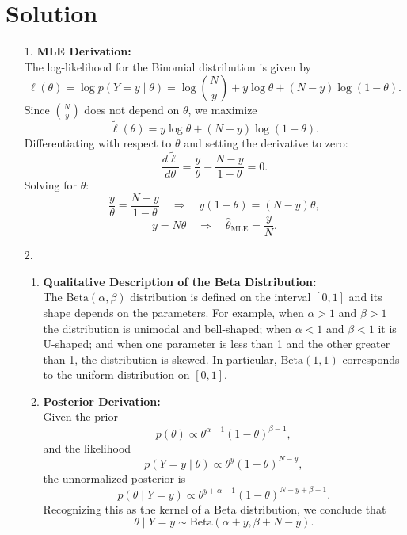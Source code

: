 \documentclass[submit]{../harvardml}
\newenvironment{answer}
  {\section*{Solution}}
{}
\begin{document}
\begin{answer}
  \begin{enumerate}
    \item[1.]
      \textbf{MLE Derivation:}\\
      The log-likelihood for the Binomial distribution is given by
      \[
      \ell(\theta) = \log p(Y=y \mid \theta) = \log \binom{N}{y} + y\log\theta + (N-y)\log(1-\theta).
      \]
      Since \(\binom{N}{y}\) does not depend on \(\theta\), we maximize
      \[
      \tilde{\ell}(\theta) = y\log\theta + (N-y)\log(1-\theta).
      \]
      Differentiating with respect to \(\theta\) and setting the derivative to zero:
      \[
      \frac{d\tilde{\ell}}{d\theta} = \frac{y}{\theta} - \frac{N-y}{1-\theta} = 0.
      \]
      Solving for \(\theta\):
      \[
      \frac{y}{\theta} = \frac{N-y}{1-\theta} \quad \Rightarrow \quad y(1-\theta) = (N-y)\theta,
      \]
      \[
      y = N\theta \quad \Rightarrow \quad \hat{\theta}_{\text{MLE}} = \frac{y}{N}.
      \]

    \item[2.]
      \begin{enumerate}
        \item \textbf{Qualitative Description of the Beta Distribution:}\\[1mm]
              The \(\mathrm{Beta}(\alpha,\beta)\) distribution is defined on the interval \([0,1]\) and its shape depends on the parameters. For example, when \(\alpha>1\) and \(\beta>1\) the distribution is unimodal and bell-shaped; when \(\alpha<1\) and \(\beta<1\) it is U-shaped; and when one parameter is less than 1 and the other greater than 1, the distribution is skewed. In particular, \(\mathrm{Beta}(1,1)\) corresponds to the uniform distribution on \([0,1]\).

        \item \textbf{Posterior Derivation:}\\[1mm]
              Given the prior
              \[
              p(\theta) \propto \theta^{\alpha-1}(1-\theta)^{\beta-1},
              \]
              and the likelihood
              \[
              p(Y=y\mid\theta) \propto \theta^{y}(1-\theta)^{N-y},
              \]
              the unnormalized posterior is
              \[
              p(\theta\mid Y=y) \propto \theta^{y+\alpha-1}(1-\theta)^{N-y+\beta-1}.
              \]
              Recognizing this as the kernel of a Beta distribution, we conclude that
              \[
              \theta\mid Y=y \sim \mathrm{Beta}(\alpha+y,\beta+N-y).
              \]
      \end{enumerate}


\end{enumerate}
\end{answer}
\end{document}
